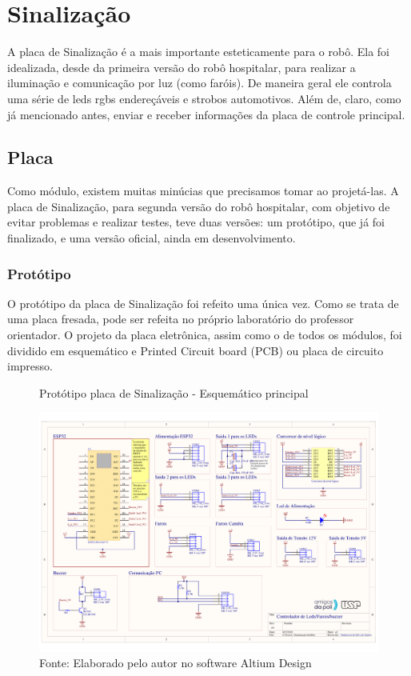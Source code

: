 \documentclass[../delivery_hospital_report.tex]{subfiles}
\begin{document}
\clearpage

\section{Sinalização}

A placa de Sinalização é a mais importante esteticamente para o robô. Ela foi idealizada, desde da primeira versão do robô hospitalar, para realizar a iluminação e comunicação por luz (como faróis). De maneira geral ele controla uma série de leds rgbs endereçáveis e strobos automotivos. Além de, claro, como já mencionado antes, enviar e receber informações da placa de controle principal.

\subsection{Placa}

Como módulo, existem muitas minúcias que precisamos tomar ao projetá-las. A placa de Sinalização, para segunda versão do robô hospitalar, com objetivo de evitar problemas e realizar testes, teve duas versões: um protótipo, que já foi finalizado, e uma versão oficial, ainda em desenvolvimento. 

\subsubsection{Protótipo}

O protótipo da placa de Sinalização foi refeito uma única vez. Como se trata de uma placa fresada, pode ser refeita no próprio laboratório do professor orientador. O projeto da placa eletrônica, assim como o de todos os módulos, foi dividido em esquemático e Printed Circuit board (PCB)  ou placa de circuito impresso.

\begin{figure}[!h]
\centering
    \caption{Protótipo placa de Sinalização - Esquemático principal }
    \centering %
    \includegraphics[width=17cm]{modulos/Sinalização-1.png}
    \caption*{Fonte: Elaborado pelo autor no software Altium Design\cite{altium21} }
    \label{Protótipo placa de ## - Esquemático principal}
\end{figure}
\end{document}
